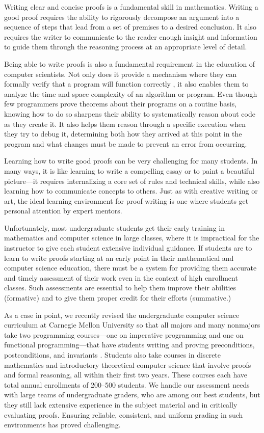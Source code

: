 \documentclass[12pt]{article}
\begin{document}
Writing clear and concise proofs is a fundamental skill
in mathematics.  Writing a good proof requires the ability to
rigorously decompose an argument into a sequence of steps that lead
from a set of premises to
a desired conclusion.  It also requires the
writer to communicate to the reader enough insight and information to guide them
through the reasoning process at an appropriate level of detail.

Being able to write proofs is also a fundamental requirement in the
education of computer scientists.  Not only does it provide a
mechanism where they can formally verify that a program will function
correctly \citep{hoare-cacm69}, it also enables them to analyze the
time and space complexity of an algorithm or program.  Even though few
programmers prove theorems about their programs on a routine basis,
knowing how to do so sharpens their ability to systematically reason
about code as they create it.  It also helps them reason through a
specific execution when they try to debug it, determining both how
they arrived at this point in the program and what changes must be
made to prevent an error from occurring.


Learning how to write good proofs can be very challenging for many
students.  In many ways, it is like learning to write a compelling
essay or to paint a beautiful picture---it requires internalizing a
core set of rules and technical skills, while also learning how to
communicate concepts to others.  Just as with creative writing or art,
the ideal learning environment for proof writing is one where
students get personal attention by expert mentors.

Unfortunately, most undergraduate students get their early training in
mathematics and computer science in large classes, where it is
impractical for the instructor to give each student extensive
individual guidance.  If students are to learn to write proofs
starting at an early point in their mathematical and computer science
education, there must be a system for providing them accurate and
timely assessment of their work even in the context of high enrollment
classes.  Such assessments are essential to help them improve their
abilities (formative) and to give them proper credit for their efforts
(summative.)

As a case in point, we recently revised the undergraduate computer science
curriculum at Carnegie Mellon University so that all majors and many
nonmajors take two programming courses---one on imperative programming
and one on functional programming---that have students writing and
proving preconditions, postconditions, and invariants
\citep{bryant-ugrad10}.  Students also take courses in
discrete mathematics and introductory theoretical computer science
that involve proofs and formal reasoning, all within their first two years.
These courses each have
total annual enrollments of 200--500 students.  We handle our
assessment needs with large teams of undergraduate graders, who are
among our best students, but they still lack extensive experience in
the subject material and in critically evaluating proofs.  Ensuring
reliable, consistent, and uniform grading in such environments has proved
challenging.
\end{document}
